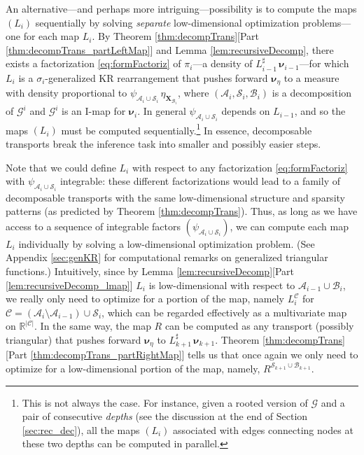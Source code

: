 \documentclass[twoside,11pt]{article}
\newcommand{\genm}{\boldsymbol{\nu} }   %
\newcommand{\re}{\mathbb{R}}
\newcommand{\Bc}{\mathcal{B}}
\newcommand{\Cc}{\mathcal{C}}
\newcommand{\Ac}{\mathcal{A}}
\newcommand{\Sc}{\mathcal{S}}
\newcommand{\Xb}{\boldsymbol{X}}
\newcommand{\Gcb}{\boldsymbol{\mathcal{G}}}
\newcommand{\lmap}{L} %
\newcommand{\rmap}{R} %
\newcommand{\Aset}{ \Ac }
\newcommand{\Bset}{ \Bc }
\newcommand{\Sset}{ \Sc }
\newcommand{\pull}{^\sharp}
\begin{document}
An alternative---and perhaps more
intriguing---possibility is to compute the maps $(\lmap_i)$ sequentially
by solving \textit{separate} low-dimensional optimization problems---one for
each map $\lmap_i$.  
By Theorem \ref{thm:decompTrans}[Part \ref{thm:decompTrans_partLeftMap}]
and Lemma \ref{lem:recursiveDecomp}, 
there exists a factorization
\eqref{eq:formFactoriz} of
%
$\pi_i$---a density of $L_{i-1}\pull\,\genm_{i-1}$---for
which $\lmap_i$ is a $\sigma_i$-generalized
KR rearrangement that pushes forward $\genm_\eta$ to a measure
with density proportional to
$\psi_{\Aset_i \cup \Sset_i}  \, 
\eta_{\Xb_{\Bset_i}}$, where
$(\Aset_i , \Sset_i, \Bset_i)$ is a decomposition of
$\Gcb^i$ and $\Gcb^i$  is an I-map for $\genm_i$.
In general $\psi_{\Aset_i \cup \Sset_i}$ depends  on
%
$\lmap_{i-1}$, and so the maps $(\lmap_i)$ must be computed sequentially.\footnote{
This is not always the case.
%
%
%
%
%
%
%
%
%
%
%
For instance, given a rooted version of $\Gcb$ and a pair of consecutive {\it
  depths} (see the discussion at
the end of Section \ref{sec:rec_dec}), all the maps $(\lmap_i)$
associated with edges connecting nodes at these two depths can be computed in parallel.}
%
%
%
%
%
%
%
%
%
%
In essence, 
decomposable transports break the inference task into 
smaller and possibly easier steps.

Note that we could define $\lmap_i$ with respect to any
factorization \eqref{eq:formFactoriz} with
$\psi_{\Aset_i \cup \Sset_i}$ integrable:
these different factorizations
%
would lead to a family of decomposable transports with the same
low-dimensional 
structure and sparsity patterns %
(as predicted by Theorem \ref{thm:decompTrans}).
Thus, as long as we have access to a sequence of
integrable factors $(\psi_{\Aset_i \cup \Sset_i})$, we can 
compute each map $\lmap_i$ individually by solving a
low-dimensional  
optimization problem. (See Appendix \ref{sec:genKR} for computational
remarks on generalized triangular functions.) 
Intuitively, since by
Lemma \ref{lem:recursiveDecomp}[Part \ref{lem:recursiveDecomp_lmap}] 
$\lmap_i$ is low-dimensional with respect to $\Aset_{i-1} \cup \Bset_{i}$,
we really only need to optimize for a portion of the map, namely
$\lmap_i^{\Cc}$ for $\Cc = (\Aset_{i} \setminus \Aset_{i-1}) \cup \Sset_{i}$,
which can be regarded effectively as a multivariate map on 
$ \re^{|\Cc|} $. 
%
In the same way, the map $\rmap$ can be computed as any transport 
(possibly triangular) that pushes forward $\genm_\eta$ to 
%
$L_{k+1}\pull\,\genm_{k+1}$.
Theorem \ref{thm:decompTrans}[Part \ref{thm:decompTrans_partRightMap}] 
tells us that once again we only need to optimize for
a low-dimensional portion of the map, namely, $\rmap^{\Sset_{k+1} \cup \Bset_{k+1}}$.
\end{document}
